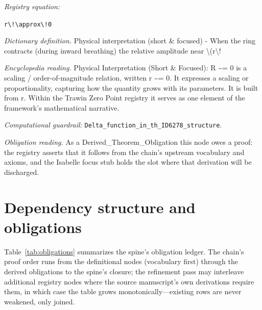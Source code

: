 \documentclass[11pt]{article}
\theoremstyle{remark}
\begin{document}
\noindent\textit{Registry equation:}\par
{\small\texttt{r\textbackslash{}!\textbackslash{}approx\textbackslash{}!0}}\par\medskip
\noindent\textit{Dictionary definition.} Physical interpretation (short \& focused) - When the ring contracts (during inward breathing) the relative amplitude near \textbackslash{}(r\textbackslash{}!\par\medskip
\noindent\textit{Encyclopedia reading.} Physical Interpretation (Short \& Focused): R \textasciitilde{}= 0 is a scaling / order-of-magnitude relation, written r \textasciitilde{}= 0. It expresses a scaling or proportionality, capturing how the quantity grows with its parameters. It is built from r. Within the Trawin Zero Point registry it serves as one element of the framework's mathematical narrative.
\par\medskip\noindent\textit{Computational guardrail:} \texttt{Delta\_function\_in\_th\_ID6278\_structure}.
\par\medskip\noindent\textit{Obligation reading.} As a Derived\_Theorem\_Obligation this node owes a proof: the registry asserts that it follows from the chain's upstream vocabulary and axioms, and the Isabelle focus stub holds the slot where that derivation will be discharged.

\section{Dependency structure and obligations}
\label{sec:dep}

Table~\ref{tab:obligations} summarizes the spine's obligation ledger. The chain's proof order runs from the definitional nodes (vocabulary first) through the derived obligations to the spine's closure; the refinement pass may interleave additional registry nodes where the source manuscript's own derivations require them, in which case the table grows monotonically---existing rows are never weakened, only joined.
\end{document}
